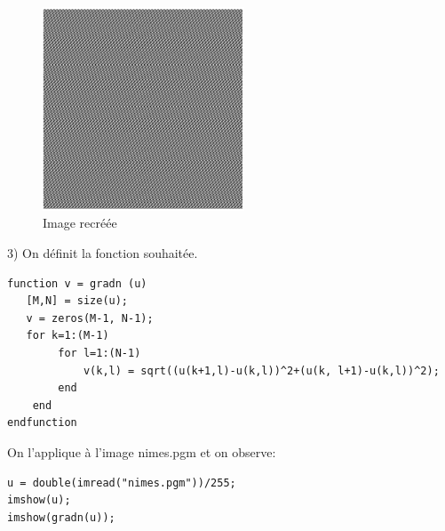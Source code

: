 \documentclass[a4paper, 11pt]{article}
\begin{document}
\begin{figure}[!h]
\centering
\includegraphics[width=6cm]{ex_5_onde_zoom_recreate.png}
\caption{Image recréée}
\end{figure}

3) On définit la fonction souhaitée. 

\begin{lstlisting}[frame=single]
function v = gradn (u)
   [M,N] = size(u);
   v = zeros(M-1, N-1);
   for k=1:(M-1)
        for l=1:(N-1)
            v(k,l) = sqrt((u(k+1,l)-u(k,l))^2+(u(k, l+1)-u(k,l))^2);
        end
    end
endfunction
\end{lstlisting}

On l'applique à l'image nimes.pgm et on observe:

\begin{lstlisting}[frame=single]
u = double(imread("nimes.pgm"))/255;
imshow(u);
imshow(gradn(u));
\end{lstlisting}

\begin{figure}[!h]
\centering
{}%
\qquad
{}%
\end{figure}
\end{document}
